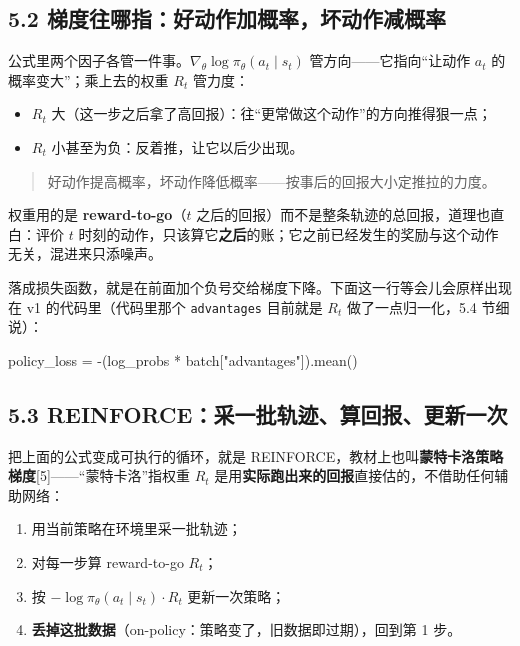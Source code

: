 \documentclass[
  chinese,
]{ctexart}
\newenvironment{Shaded}{\begin{snugshade}}{\end{snugshade}}
\newcommand{\NormalTok}[1]{\textcolor[rgb]{0.00,0.23,0.31}{#1}}
\newcommand{\OperatorTok}[1]{\textcolor[rgb]{0.37,0.37,0.37}{#1}}
\newcommand{\StringTok}[1]{\textcolor[rgb]{0.13,0.47,0.30}{#1}}
\providecommand{\tightlist}{%
  \setlength{\itemsep}{0pt}\setlength{\parskip}{0pt}}
\begin{document}
\subsection{5.2
梯度往哪指：好动作加概率，坏动作减概率}\label{ux68afux5ea6ux5f80ux54eaux6307ux597dux52a8ux4f5cux52a0ux6982ux7387ux574fux52a8ux4f5cux51cfux6982ux7387}

公式里两个因子各管一件事。\(\nabla_\theta \log \pi_\theta(a_t\mid s_t)\)
管方向------它指向``让动作 \(a_t\) 的概率变大''；乘上去的权重 \(R_t\)
管力度：

\begin{itemize}
\tightlist
\item
  \(R_t\)
  大（这一步之后拿了高回报）：往``更常做这个动作''的方向推得狠一点；
\item
  \(R_t\) 小甚至为负：反着推，让它以后少出现。
\end{itemize}

\begin{quote}
好动作提高概率，坏动作降低概率------按事后的回报大小定推拉的力度。
\end{quote}

权重用的是 \textbf{reward-to-go}（\(t\)
之后的回报）而不是整条轨迹的总回报，道理也直白：评价 \(t\)
时刻的动作，只该算它\textbf{之后}的账；它之前已经发生的奖励与这个动作无关，混进来只添噪声。

落成损失函数，就是在前面加个负号交给梯度下降。下面这一行等会儿会原样出现在
v1 的代码里（代码里那个 \texttt{advantages} 目前就是 \(R_t\)
做了一点归一化，5.4 节细说）：

\begin{Shaded}
\begin{Highlighting}[]
\NormalTok{policy\_loss }\OperatorTok{=} \OperatorTok{{-}}\NormalTok{(log\_probs }\OperatorTok{*}\NormalTok{ batch[}\StringTok{"advantages"}\NormalTok{]).mean()}
\end{Highlighting}
\end{Shaded}

\subsection{5.3
REINFORCE：采一批轨迹、算回报、更新一次}\label{reinforceux91c7ux4e00ux6279ux8f68ux8ff9ux7b97ux56deux62a5ux66f4ux65b0ux4e00ux6b21}

把上面的公式变成可执行的循环，就是
REINFORCE，教材上也叫\textbf{蒙特卡洛策略梯度}{[}5{]}------``蒙特卡洛''指权重
\(R_t\) 是用\textbf{实际跑出来的回报}直接估的，不借助任何辅助网络：

\begin{enumerate}
\def\labelenumi{\arabic{enumi}.}
\tightlist
\item
  用当前策略在环境里采一批轨迹；
\item
  对每一步算 reward-to-go \(R_t\)；
\item
  按 \(-\log\pi_\theta(a_t\mid s_t)\cdot R_t\) 更新一次策略；
\item
  \textbf{丢掉这批数据}（on-policy：策略变了，旧数据即过期），回到第 1
  步。
\end{enumerate}
\end{document}
